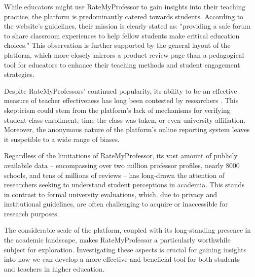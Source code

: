 \documentclass[man, 12pt]{apa7}
\begin{document}
While educators might use RateMyProfessor to gain insights into their teaching practice, the platform is predominantly catered towards students. According to the website's guidelines, their mission is clearly stated as: "providing a safe forum to share classroom experiences to help fellow students make critical education choices." This observation is further supported by the general layout of the platform, which more closely mirrors a product review page than a pedagogical tool for educators to enhance their teaching methods and student engagement strategies.

Despite RateMyProfessors' continued popularity, its ability to be an effective measure of teacher effectiveness has long been contested by researchers \textcite{rosen_correlations_2018}. This skepticism could stem from the platform's lack of mechanisms for verifying student class enrollment, time the class was taken, or even university affiliation. Moreover, the anonymous nature of the platform's online reporting system leaves it suspetible to a wide range of biases.

Regardless of the limitations of RateMyProfessor, its vast amount of publicly availabile data -- encompassing over two million professor profiles, nearly 8000 schools, and tens of millions of reviews -- has long-drawn the attention of researchers seeking to understand student perceptions in academia. This stands in contrast to formal university evaluations, which, due to privacy and institutional guidelines, are often challenging to acquire or inaccessible for research purposes. 

The considerable scale of the platform, coupled with its long-standing presence in the academic landscape, makes RateMyProfessor a particularly worthwhile subject for exploration. Investigating these aspects is crucial for gaining insights into how we can develop a more effective and beneficial tool for both students and teachers in higher education.



\end{document}
